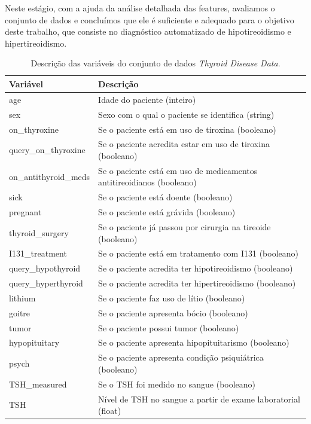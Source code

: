 \documentclass[11pt]{article}
\begin{document}
Neste estágio, com a ajuda da análise detalhada das features, avaliamos o conjunto de dados e concluímos que ele é suficiente e adequado para o objetivo deste trabalho, que consiste no diagnóstico automatizado de hipotireoidismo e hipertireoidismo.


\begin{table}[H]
\centering
\caption{Descrição das variáveis do conjunto de dados \textit{Thyroid Disease Data}.}
\label{tab:features}
\begin{tabular}{|l|p{10cm}|}
\hline
\textbf{Variável} & \textbf{Descrição} \\ \hline
age & Idade do paciente (inteiro) \\ \hline
sex & Sexo com o qual o paciente se identifica (string) \\ \hline
on\_thyroxine & Se o paciente está em uso de tiroxina (booleano) \\ \hline
query\_on\_thyroxine & Se o paciente acredita estar em uso de tiroxina (booleano) \\ \hline
on\_antithyroid\_meds & Se o paciente está em uso de medicamentos antitireoidianos (booleano) \\ \hline
sick & Se o paciente está doente (booleano) \\ \hline
pregnant & Se o paciente está grávida (booleano) \\ \hline
thyroid\_surgery & Se o paciente já passou por cirurgia na tireoide (booleano) \\ \hline
I131\_treatment & Se o paciente está em tratamento com I131 (booleano) \\ \hline
query\_hypothyroid & Se o paciente acredita ter hipotireoidismo (booleano) \\ \hline
query\_hyperthyroid & Se o paciente acredita ter hipertireoidismo (booleano) \\ \hline
lithium & Se o paciente faz uso de lítio (booleano) \\ \hline
goitre & Se o paciente apresenta bócio (booleano) \\ \hline
tumor & Se o paciente possui tumor (booleano) \\ \hline
hypopituitary & Se o paciente apresenta hipopituitarismo (booleano) \\ \hline
psych & Se o paciente apresenta condição psiquiátrica (booleano) \\ \hline
TSH\_measured & Se o TSH foi medido no sangue (booleano) \\ \hline
TSH & Nível de TSH no sangue a partir de exame laboratorial (float) \\ \hline

\end{tabular}
\end{table}
\end{document}
